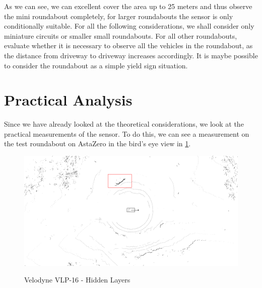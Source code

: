 \documentclass[11pt,oneside,openright]{mpreport}
\begin{document}

As we can see, we can excellent cover the area up to 25 meters and thus observe the mini roundabout completely, for larger roundabouts the sensor is only conditionally suitable. 
For all the following considerations, we shall consider only miniature circuits or smaller small roundabouts. 
For all other roundabouts, evaluate whether it is necessary to observe all the vehicles in the roundabout, as the distance from driveway to driveway increases accordingly.
It is maybe possible to consider the roundabout as a simple yield sign situation.

\section{Practical Analysis}

Since we have already looked at the theoretical considerations, we look at the practical measurements of the sensor.
To do this, we can see a measurement on the test roundabout on AstaZero in the bird's eye view in \cref{velodyne_hidden}.

\begin{figure}[!ht]
\caption{Velodyne VLP-16 - Hidden Layers}
\includegraphics[width=\textwidth]{bilder/velodyne_back.png}
\label{velodyne_hidden}
\end{figure}
\end{document}
